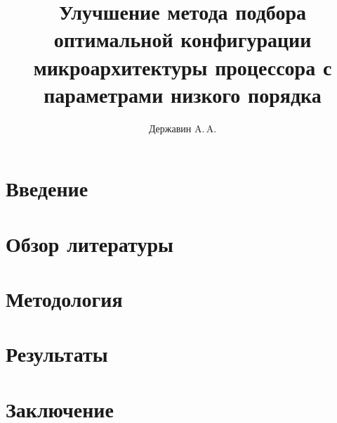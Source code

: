 \documentclass{mipt-thesis-bs}
\title{Улучшение метода подбора оптимальной конфигурации микроархитектуры процессора с параметрами низкого порядка}
\author{Державин A.\,A.}
\begin{document}
\frontmatter
\titlecontents{}
\mainmatter{}


\chapter{Введение}



\chapter{Обзор литературы}



\chapter{Методология}



\chapter{Результаты}



\chapter{Заключение}




\backmatter{}
\printbib{}

\end{document}
